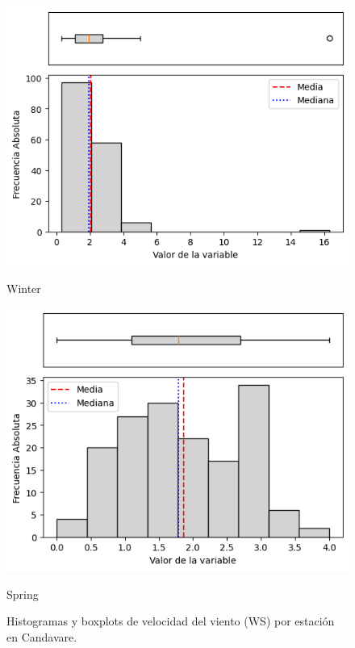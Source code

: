 \begin{figure}[H]
\begin{minipage}{0.30\textwidth}
  \includegraphics[width=\linewidth]{resultados/por_estacion_del_anio/boxplot_clases_por_estacion/Candavare/WS_HistBoxplot_Winter.png}
  \caption*{Winter}
\end{minipage}
\hfill
\begin{minipage}{0.30\textwidth}
  \includegraphics[width=\linewidth]{resultados/por_estacion_del_anio/boxplot_clases_por_estacion/Candavare/WS_HistBoxplot_Spring.png}
  \caption*{Spring}
\end{minipage}
\caption{Histogramas y boxplots de velocidad del viento (WS) por estación en Candavare.}
\label{fig:candavare_ws_hist}
\end{figure}

